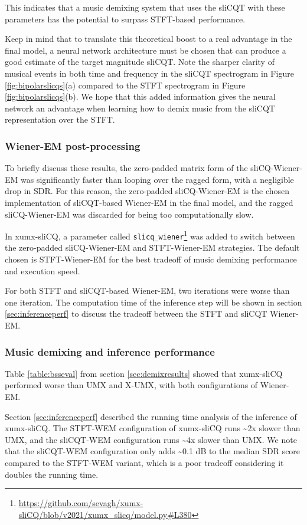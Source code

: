 \documentclass[report.tex]{subfiles}
\begin{document}
This indicates that a music demixing system that uses the sliCQT with these parameters has the potential to surpass STFT-based performance.

Keep in mind that to translate this theoretical boost to a real advantage in the final model, a neural network architecture must be chosen that can produce a good estimate of the target magnitude sliCQT. Note the sharper clarity of musical events in both time and frequency in the sliCQT spectrogram in Figure \ref{fig:bipolarslicqs}(a) compared to the STFT spectrogram in Figure \ref{fig:bipolarslicqs}(b). We hope that this added information gives the neural network an advantage when learning how to demix music from the sliCQT representation over the STFT.


\subsubsection{Wiener-EM post-processing}

To briefly discuss these results, the zero-padded matrix form of the sliCQ-Wiener-EM was significantly faster than looping over the ragged form, with a negligible drop in SDR. For this reason, the zero-padded sliCQ-Wiener-EM is the chosen implementation of sliCQT-based Wiener-EM in the final model, and the ragged sliCQ-Wiener-EM was discarded for being too computationally slow.

In xumx-sliCQ, a parameter called \Verb#slicq_wiener#\footnote{\url{https://github.com/sevagh/xumx-sliCQ/blob/v2021/xumx_slicq/model.py\#L380}} was added to switch between the zero-padded sliCQ-Wiener-EM and STFT-Wiener-EM strategies. The default chosen is STFT-Wiener-EM for the best tradeoff of music demixing performance and execution speed.

For both STFT and sliCQT-based Wiener-EM, two iterations were worse than one iteration. The computation time of the inference step will be shown in section \ref{sec:inferenceperf} to discuss the tradeoff between the STFT and sliCQT Wiener-EM.

\subsubsection{Music demixing and inference performance}

Table \ref{table:bsseval} from section \ref{sec:demixresults} showed that xumx-sliCQ performed worse than UMX and X-UMX, with both configurations of Wiener-EM.

Section \ref{sec:inferenceperf} described the running time analysis of the inference of xumx-sliCQ. The STFT-WEM configuration of xumx-sliCQ runs \textasciitilde2x slower than UMX, and the sliCQT-WEM configuration runs \textasciitilde4x slower than UMX. We note that the sliCQT-WEM configuration only adds \textasciitilde0.1 dB to the median SDR score compared to the STFT-WEM variant, which is a poor tradeoff considering it doubles the running time.
\end{document}
